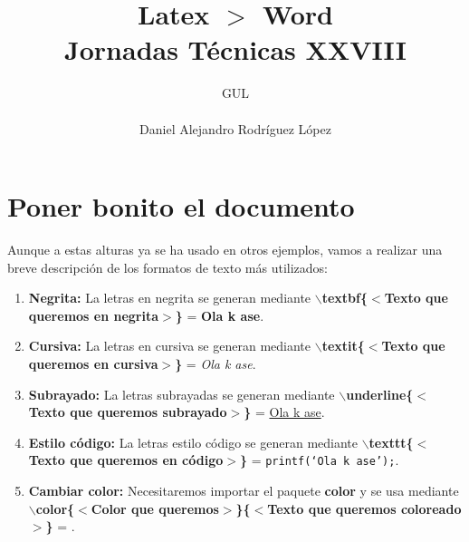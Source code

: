 \documentclass[10pt,a4paper,titlepage]{article} %
\title{ \textbf{ \Huge{Latex $>$ Word}} \\ Jornadas Técnicas XXVIII}
\author{
		\begin{tabular}{l}
			\multicolumn{1}{l}{GUL} \\ \hline \\
			Daniel Alejandro Rodríguez López \\
		\end{tabular}
}
\begin{document}
\maketitle

\newpage

\section*{Poner bonito el documento}
	Aunque a estas alturas ya se ha usado en otros ejemplos, vamos a realizar una breve descripción de los formatos de texto más utilizados:
	\begin{enumerate}
		\item \textbf{Negrita:} La letras en negrita se generan mediante \textbf{$\backslash$textbf\{$<$Texto que queremos en negrita$>$\}} = \textbf{Ola k ase}.
		\item \textbf{Cursiva:} La letras en cursiva se generan mediante \textbf{$\backslash$textit\{$<$Texto que queremos en cursiva$>$\}} = \textit{Ola k ase}.
		\item \textbf{Subrayado:} La letras subrayadas se generan mediante \textbf{$\backslash$underline\{$<$Texto que queremos subrayado$>$\}} = \underline{Ola k ase}.
		\item \textbf{Estilo código:} La letras estilo código se generan mediante \textbf{$\backslash$texttt\{$<$Texto que queremos en código$>$\}} = \texttt{printf(`Ola k ase');}.
		\item \textbf{Cambiar color:} Necesitaremos importar el paquete \textbf{color} y se usa mediante \textbf{$\backslash$color\{$<$Color que queremos$>$\}\{$<$Texto que queremos coloreado$>$\}} = \color{blue}{Color azul}.
	\end{enumerate}
\end{document}
